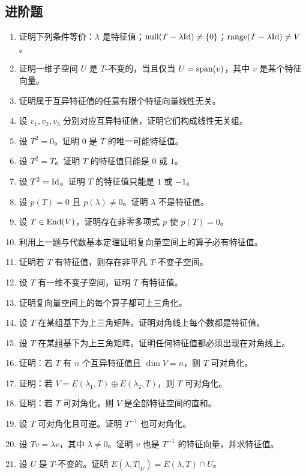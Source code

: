 \subsection*{进阶题}
\begin{enumerate}[resume, label=\textbf{\arabic*.}, leftmargin=*, itemsep=0.5em]
\item \medium 证明下列条件等价：$\lambda$ 是特征值；$\mathrm{null}(T-\lambda\mathrm{Id})\neq\{0\}$；$\mathrm{range}(T-\lambda\mathrm{Id})\neq V$。
\item \medium 证明一维子空间 $U$ 是 $T$-不变的，当且仅当 $U=\operatorname{span}(v)$，其中 $v$ 是某个特征向量。
\item \medium 证明属于互异特征值的任意有限个特征向量线性无关。
\item \medium 设 $v_1,v_2,v_3$ 分别对应互异特征值，证明它们构成线性无关组。
\item \medium 设 $T^2=0$。证明 $0$ 是 $T$ 的唯一可能特征值。
\item \medium 设 $T^2=T$。证明 $T$ 的特征值只能是 $0$ 或 $1$。
\item \medium 设 $T^2=\mathrm{Id}$。证明 $T$ 的特征值只能是 $1$ 或 $-1$。
\item \medium 设 $p(T)=0$ 且 $p(\lambda)\neq 0$。证明 $\lambda$ 不是特征值。
\item \medium 设 $T\in\mathrm{End}(V)$，证明存在非零多项式 $p$ 使 $p(T)=0$。
\item \medium 利用上一题与代数基本定理证明复向量空间上的算子必有特征值。
\item \medium 证明若 $T$ 有特征值，则存在非平凡 $T$-不变子空间。
\item \medium 设 $T$ 有一维不变子空间，证明 $T$ 有特征值。
\item \medium 证明复向量空间上的每个算子都可上三角化。
\item \medium 设 $T$ 在某组基下为上三角矩阵。证明对角线上每个数都是特征值。
\item \medium 设 $T$ 在某组基下为上三角矩阵。证明任何特征值都必须出现在对角线上。
\item \medium 证明：若 $T$ 有 $n$ 个互异特征值且 $\dim V=n$，则 $T$ 可对角化。
\item \medium 证明：若 $V=E(\lambda_1,T)\oplus E(\lambda_2,T)$，则 $T$ 可对角化。
\item \medium 证明：若 $T$ 可对角化，则 $V$ 是全部特征空间的直和。
\item \medium 设 $T$ 可对角化且可逆。证明 $T^{-1}$ 也可对角化。
\item \medium 设 $Tv=\lambda v$，其中 $\lambda\neq 0$。证明 $v$ 也是 $T^{-1}$ 的特征向量，并求特征值。
\item \medium 设 $U$ 是 $T$-不变的。证明 $E(\lambda,T|_U)=E(\lambda,T)\cap U$。

\end{enumerate}
